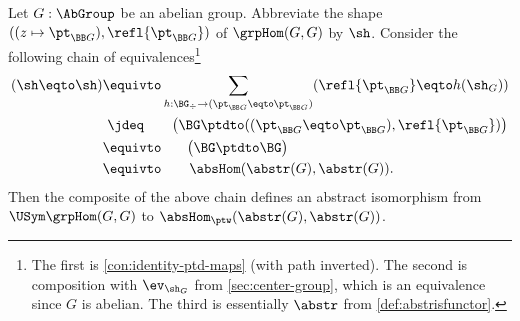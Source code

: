 \begin{lemma}\label{lem:grpHomOK}
Let $G:\AbGroup$ be an abelian group. Abbreviate the shape
$((z\mapsto \pt_{\BB G}),\refl{\pt_{\BB G}})$ of $\grpHom(G,G)$ by $\sh$. 
Consider the following chain of equivalences\footnote{%
The first is \cref{con:identity-ptd-maps} (with path inverted). 
The second is composition with $\ev_{\sh_G}$
from \cref{sec:center-group}, which is an equivalence since $G$ is abelian.
The third is essentially $\abstr$ from \cref{def:abstrisfunctor}.}
\begin{align*}
(\sh\eqto\sh) &\equivto 
\sum_{h:\BG_\div\to(\pt_{\BB G}\eqto\pt_{\BB G})} 
  (\refl{\pt_{\BB G}}\eqto h(\sh_G)) \\
              &~\jdeq \qquad \bigl(\BG\ptdto((\pt_{\BB G}\eqto\pt_{\BB G}),\refl{\pt_{\BB G}})\bigr)\\
 &\equivto \qquad\! \bigl(\BG\ptdto\BG\bigr)\\
 &\equivto \qquad \absHom(\abstr(G),\abstr(G)).
\end{align*}
Then the composite of the above chain defines an abstract isomorphism
from $\USym\grpHom(G,G)$ to $\absHom_{\ptw}(\abstr(G),\abstr(G))$.
\end{lemma}
